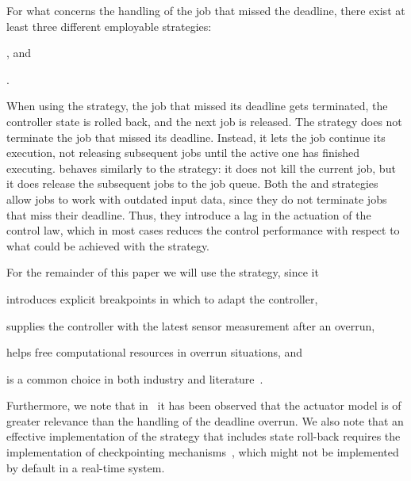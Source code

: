 For what concerns the handling of the job that missed the deadline, there exist at least three different employable strategies:
\begin{enumerate*}[label=(\alph*)] %
    \item \emph{\tK{}}
    \item \emph{\tS{}}, and 
    \item \emph{\tQ{}}.
\end{enumerate*}
When using the \tK{} strategy, the job that missed its deadline gets terminated, the controller state is rolled back, and the next job is released. 
The \tS{} strategy does not terminate the job that missed its deadline. 
Instead, it lets the job continue its execution, not releasing subsequent jobs until the active one has finished executing.
\tQ{} behaves similarly to the \tS{} strategy: it does not kill the current job, but it does release the subsequent jobs to the job queue.
Both the \tS{} and \tQ{} strategies allow jobs to work with outdated input data, since they do not terminate jobs that miss their deadline.
Thus, they introduce a lag in the actuation of the control law, which in most cases reduces the control performance with respect to what could be achieved with the \tK{} strategy.

For the remainder of this paper we will use the \tK{} strategy, since it
\begin{enumerate*}[label=(\alph*)]
    \item introduces explicit breakpoints in which to adapt the controller,
    \item supplies the controller with the latest sensor measurement after an overrun,
    \item helps free computational resources in overrun situations, and
    \item is a common choice in both industry and literature~\cite{akesson:2020, Bernat:2001, Hertneck:2019}.
\end{enumerate*}
Furthermore, we note that in~\cite{Vreman:2021ecrts} it has been observed that the actuator model is of greater relevance than the handling of the deadline overrun.
We also note that an effective implementation of the \tK{} strategy that includes state roll-back requires the implementation of checkpointing mechanisms~\cite{Zhang:2003,Seong:2001}, which might not be implemented by default in a real-time system.


